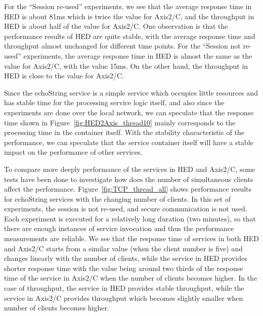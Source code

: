 \documentclass[conference]{IEEEtran}
\begin{document}
For the ``Session re-used'' experiments, we see that the average response time
in HED is about 81ms which is twice the value for Axis2/C, and the throughput in HED is about half
of the value for Axis2/C. One observation is that the performance results of HED are quite stable, with
the average response time and throughput almost unchanged for different time points.
For the ``Session not re-used'' experiments, the average response time in HED is
almost the same as the value for Axis2/C, with the value 15ms. On the other hand, the throughput in
HED is close to the value for Axis2/C.

Since the echoString service is a simple service which occupies little
resources and has stable time for the processing service logic itself, and also since the experiments are done over the local
network, we can speculate that the response time shown in Figure~\ref{fig:HED2Axis_thread10} mainly
corresponds to the processing time in the container itself.
With the stability characteristic of the performance, we can speculate that the
service container itself will have a stable impact on the performance of other services.

To compare more deeply performance of the services in HED and Axis2/C, some
tests have been done to investigate how does the number of simultaneous clients affect
the performance. Figure~\ref{fig:TCP_thread_all} shows performance results for echoString
services with the changing number of clients. In this set of experiments, the session is not re-used, and secure
communication is not used. Each experiment is executed for a relatively long duration (two minutes),
so that there are enough instances of service invocation and thus the performance measurements are
reliable. We see that the response time of services in both HED and Axis2/C starts from a
similar value (when the client number is five) and changes linearly with the number of
clients, while the service in HED provides shorter response time with the value being around two thirds of the
response time of the service in Axis2/C when the number of clients becomes higher.
In the case of throughput, the service in HED provides stable throughput, while
the service in Axis2/C provides throughput which  becomes slightly smaller when number of clients becomes
higher.
\end{document}
